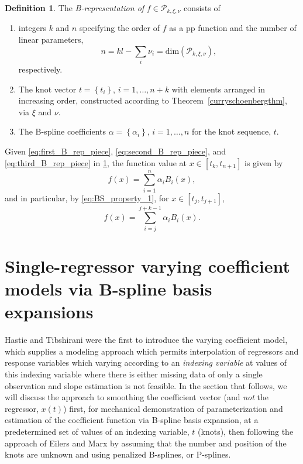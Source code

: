\documentclass[12pt]{article}
\newcommand{\PP}{\mathcal{P}}
\theoremstyle{definition}
\newtheorem{definition}{Definition}[section]
\begin{document}
\begin{definition} \label{B_representation_definition}
The \emph{B-representation of } $f \in \PP_{k,\xi,\nu}$ consists of 
\begin{enumerate}
\item \label{eq:first_B_rep_piece} integers $k$ and $n$ specifying the order of $f$ as a pp function and the number of linear parameters, 
\[
n = kl - \sum_{i}\nu_i = \mbox{dim}\left(\PP_{k,\xi,\nu}\right),
\]
respectively. 
\item \label{eq:second_B_rep_piece}The knot vector $t = \left \{t_i \right\}$, $i=1,\dots, n+k$ with elements arranged in increasing order, constructed according to Theorem~\ref{curryschoenbergthm}, via $\xi$ and $\nu$.
\item \label{eq:third_B_rep_piece} The B-spline coefficients $\alpha=\left \{\alpha_i \right\}$, $i=1 ,\dots, n$ for the knot sequence, $t$.
\end{enumerate}
\end{definition}
\vspace{1pt}
Given \ref{eq:first_B_rep_piece}, \ref{eq:second_B_rep_piece}, and \ref{eq:third_B_rep_piece} in \ref{B_representation_definition}, the function value at $x\in \left[t_k, t_{n+1}\right]$ is given by 
\begin{equation*}
f\left(x\right) = \sum_{i=1}^n \alpha_i B_i\left(x\right),
\end{equation*}
and in particular, by \ref{eq:BS_property_1}, for $x\in \left[t_j, t_{j+1} \right]$,
\[
f\left(x\right) = \sum_{i=j}^{j+k-1} \alpha_i B_i\left(x\right).
\]





\section{Single-regressor varying coefficient models via B-spline basis expansions}

Hastie and Tibshirani were the first to introduce the varying coefficient model, which supplies a modeling approach which permits interpolation of regressors and response variables which varying according to an \emph{indexing variable} at values of this indexing variable where there is either missing data of only a single observation and slope estimation is not feasible. In the section that follows, we will discuss the approach to smoothing the coefficient vector (and \emph{not} the regressor, $x\left(t\right)$) first, for mechanical demonstration of parameterization and estimation of the coefficient function via B-spline basis expansion, at a predetermined set of values of an indexing variable, $t$ (knots), then following the approach of Eilers and Marx by assuming that the number and position of the knots are unknown and using penalized B-splines, or P-splines. 
\end{document}
